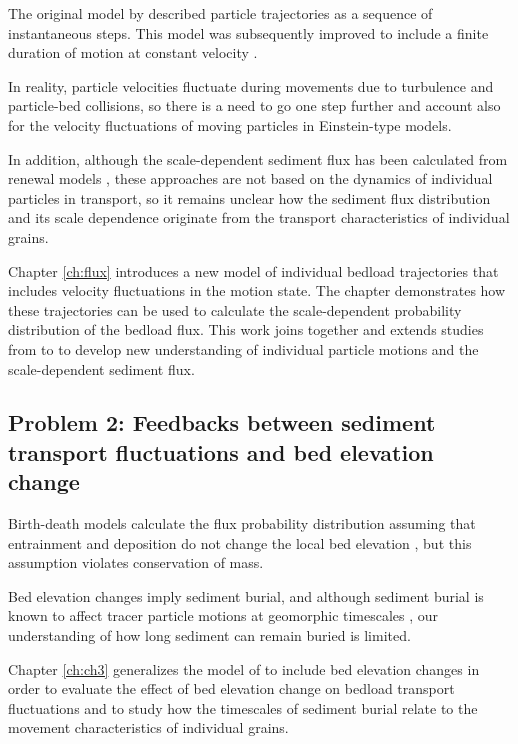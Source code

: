 The original model by \citet{Einstein1937} described particle trajectories as a sequence of instantaneous steps. This model was subsequently improved to include a finite duration of motion at constant velocity \citep{Lisle1998,Lajeunesse2017}.

In reality, particle velocities fluctuate during movements due to turbulence and particle-bed collisions, so there is a need to go one step further and account also for the velocity fluctuations of moving particles in Einstein-type models.

In addition, although the scale-dependent sediment flux has been calculated from renewal models \citep{Turowski2010,Ancey2020a}, these approaches are not based on the dynamics of individual particles in transport, so it remains unclear how the sediment flux distribution and its scale dependence originate from the transport characteristics of individual grains.

Chapter \ref{ch:flux} introduces a new model of individual bedload trajectories that includes velocity fluctuations in the motion state. The chapter demonstrates how these trajectories can be used to calculate the scale-dependent probability distribution of the bedload flux.
This work joins together and extends studies from \citet{Einstein1937} to \citet{Ancey2020a} to develop new understanding of individual particle motions and the scale-dependent sediment flux.

\subsection{Problem 2: Feedbacks between sediment transport fluctuations and bed elevation change}

Birth-death models calculate the flux probability distribution assuming that entrainment and deposition do not change the local bed elevation \citep{Heyman2013,Ancey2014}, but this assumption violates conservation of mass.

Bed elevation changes imply sediment burial, and although sediment burial is known to affect tracer particle motions at geomorphic timescales \citep{Ferguson2002,Hassan2017}, our understanding of how long sediment can remain buried is limited.

Chapter \ref{ch:ch3} generalizes the model of \citet{Ancey2008} to include bed elevation changes in order to evaluate the effect of bed elevation change on bedload transport fluctuations and to study how the timescales of sediment burial relate to the movement characteristics of individual grains.


